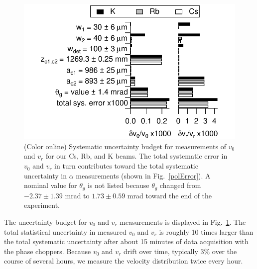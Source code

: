 \documentclass[twocolumn,pra,showpacs,superscriptaddress,longbibliography]{revtex4-1}   %
\newcommand{\figref}[1]{Fig.~\ref{#1}}
\begin{document}
\begin{figure}
\includegraphics[width=\linewidth,keepaspectratio]{displayVelErrors.pdf}
\caption{\label{velError}(Color online) Systematic uncertainty budget for measurements of $v_0$ and $v_r$ for our Cs, Rb, and K beams. 
The total systematic error in $v_0$ and $v_r$ in turn contributes toward the total systematic uncertainty in $\alpha$ measurements (shown in \figref{polError}).
A nominal value for $\theta_g$ is not listed because $\theta_g$ changed from $-2.37 \pm 1.39$ mrad to $1.73 \pm 0.59$ mrad toward the end of the experiment.}
\end{figure}

The uncertainty budget for $v_0$ and $v_r$ measurements is displayed in \figref{velError}. 
The total statistical uncertainty in measured $v_0$ and $v_r$ is roughly 10 times larger than the total systematic uncertainty after about 15 minutes of data acquisition with the phase choppers.
Because $v_0$ and $v_r$ drift over time, typically 3\% over the course of several hours, we measure the velocity distribution twice every hour. 
\end{document}
